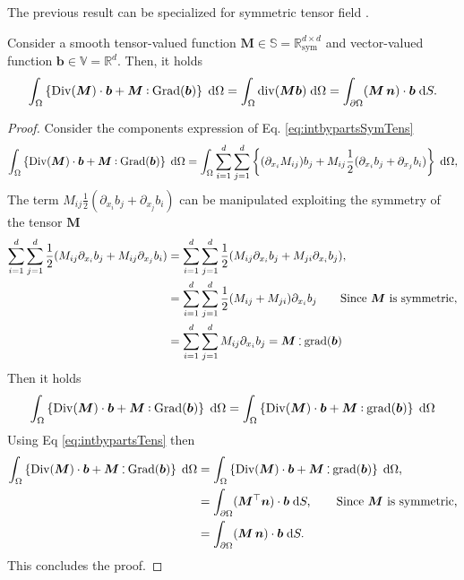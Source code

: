 The previous result can be specialized for symmetric tensor field \cite[Chapter 1]{boffi2013mixed}. 
\begin{theorem}\label{th:greenSymTens}
Consider a smooth tensor-valued function $\bm{M} \in \mathbb{S} = \mathbb{R}^{d\times d}_{\text{sym}}$ and vector-valued function $\bm{b} \in \mathbb{V}=\mathbb{R}^d$. Then, it holds
\begin{equation}\label{eq:intbypartsSymTens}
\int_{\Omega} \left\{\Div(\bm{M}) \cdot \bm{b} + \bm{M} \cddot \Grad(\bm{b}) \right\}  \d{\Omega} = \int_{\Omega} \div(\bm{M} \bm{b}) \d{\Omega} = \int_{\partial\Omega} (\bm{M} \, \bm{n}) \cdot  \bm{b} \d{S}.
\end{equation}
\begin{proof}
	Consider the components expression of Eq. \eqref{eq:intbypartsSymTens}
	\begin{equation}
	\int_{\Omega} \left\{\Div(\bm{M}) \cdot \bm{b} + \bm{M} \cddot \Grad(\bm{b}) \right\}  \d{\Omega} =\int_{\Omega} \sum_{i=1}^{d}\sum_{j = 1}^{d}\left\{(\partial_{x_i}{M}_{ij}){b}_j + {M}_{ij} \frac{1}{2}(\partial_{x_i}{b}_j + \partial_{x_j}{b}_i) \right\}  \d{\Omega}, 
	\end{equation}
	The term ${M}_{ij} \frac{1}{2}(\partial_{x_i}{b}_j + \partial_{x_j}{b}_i)$ can be manipulated exploiting the symmetry of the tensor $\bm{M}$
	\begin{equation}
	\begin{aligned}
	\sum_{i=1}^{d}\sum_{j = 1}^{d} \frac{1}{2}({M}_{ij} \partial_{x_i}{b}_j + {M}_{ij} \partial_{x_j}{b}_i) &=  \sum_{i=1}^{d}\sum_{j = 1}^{d} \frac{1}{2} ({M}_{ij} \partial_{x_i}{b}_j + {M}_{ji} \partial_{x_i}{b}_j), \\
	&=  \sum_{i=1}^{d}\sum_{j = 1}^{d} \frac{1}{2}({M}_{ij} + {M}_{ji}) \partial_{x_i}{b}_j \qquad \text{Since $\bm{M}$ is symmetric}, \\
	&= \sum_{i=1}^{d}\sum_{j = 1}^{d} {M}_{ij} \partial_{x_i}{b}_j= \bm{M} \cddot \grad(\bm{b})
	\end{aligned}
	\end{equation}
	Then it holds
	\begin{equation}
	\int_{\Omega} \left\{\Div(\bm{M}) \cdot \bm{b} + \bm{M} \cddot \Grad(\bm{b}) \right\}  \d{\Omega} = \int_{\Omega} \left\{\Div(\bm{M}) \cdot \bm{b} + \bm{M} \cddot \grad(\bm{b}) \right\}  \d{\Omega}
	\end{equation}
	Using Eq \eqref{eq:intbypartsTens} then
	\begin{equation}
	\begin{aligned}
	\int_{\Omega} \left\{\Div(\bm{M}) \cdot \bm{b} + \bm{M} \cddot \Grad(\bm{b}) \right\}  \d{\Omega} &= \int_{\Omega} \left\{\Div(\bm{M}) \cdot \bm{b} + \bm{M} \cddot \grad(\bm{b}) \right\}  \d{\Omega}, \\
	&= \int_{\partial\Omega} (\bm{M}^\top \bm{n}) \cdot \bm{b} \d{S}, \qquad \text{Since $\bm{M}$ is symmetric}, \\
	&= \int_{\partial\Omega} (\bm{M} \, \bm{n}) \cdot \bm{b} \d{S}.
	\end{aligned}
	\end{equation}
	This concludes the proof.
\end{proof} 


\end{theorem}
